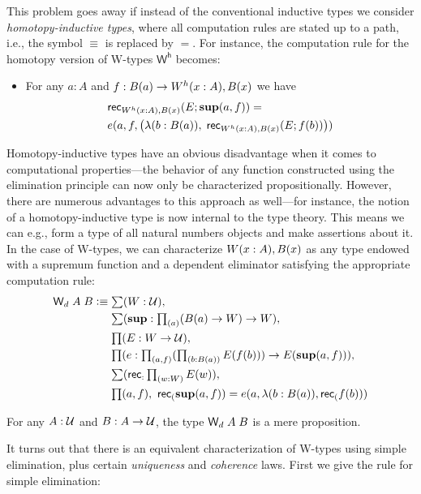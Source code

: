 This problem goes away if instead of the conventional inductive types we consider \emph{homotopy-inductive types}, where all computation rules are stated up to a path, i.e., the symbol $\equiv$ is replaced by $=$. For instance, the computation rule for the homotopy version of W-types $\mathsf{W^h}$ becomes:
\begin{itemize}
\item For any $a : A$ and $f : B(a) \to W^h(x:A), B(x)$ we have 
\begin{align*}
& \mathsf{rec}_{W^h(x:A), B(x)}(E;\mathbf{sup}(a,f)) = \\ & e(a,f,\big(\lambda (b : B(a)), \; \mathsf{rec}_{W^h(x:A), B(x)}(E;f(b))\big))
\end{align*}
\end{itemize}

Homotopy-inductive types have an obvious disadvantage when it comes to computational properties---the behavior of any function constructed using the elimination principle can now only be characterized propositionally. However, there are numerous advantages to this approach as well---for instance, the notion of a homotopy-inductive type is now internal to the type theory. This means we can e.g., form a type of all natural numbers objects and make assertions about it. In the case of W-types, we can characterize $W(x:A), B(x)$ as any type endowed with a supremum function and a dependent eliminator satisfying the appropriate computation rule:
\begin{align*}
\w_d \; A \; B \defeq & \; \sm{W : \type} \\
                      & \; \sm{\supp : \prd {a} (B(a) \to W) \to W} \\
                      & \; \prd{E : W \to \type} \\
                      & \; \prd{e : \prd{a,f} (\prd{b : B(a)} E(f(b))) \to E(\supp(a,f))} \\
                      & \; \sm{\rec : \prd{w : W} E(w)} \\
                      & \; \prd{a,f} \rec(\supp(a,f)) = e(a,\lambda (b: B(a)), \rec(f(b)))
\end{align*}

\begin{thm}
For any $A : \mathcal{U}$ and $B : A \to \mathcal{U}$, the type $\mathsf{W}_d \; A \; B$ is a mere proposition.
\end{thm}

It turns out that there is an equivalent characterization of W-types using simple elimination, plus certain \emph{uniqueness} and \emph{coherence} laws. First we give the rule for simple elimination:

